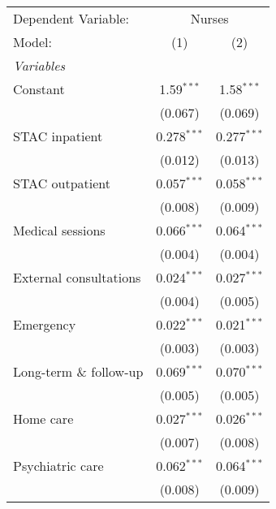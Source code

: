 
\begingroup
\centering
\begin{tabular}{lcc}
    \tabularnewline \midrule \midrule
    Dependent Variable:    & \multicolumn{2}{c}{Nurses}                      \\
    Model:                 & (1)                        & (2)                \\
    \midrule
    \emph{Variables}                                                         \\
    Constant               & 1.59$^{***}$               & 1.58$^{***}$       \\
                           & (0.067)                    & (0.069)            \\
    STAC inpatient         & 0.278$^{***}$              & 0.277$^{***}$      \\
                           & (0.012)                    & (0.013)            \\
    STAC outpatient        & 0.057$^{***}$              & 0.058$^{***}$      \\
                           & (0.008)                    & (0.009)            \\
    Medical sessions       & 0.066$^{***}$              & 0.064$^{***}$      \\
                           & (0.004)                    & (0.004)            \\
    External consultations & 0.024$^{***}$              & 0.027$^{***}$      \\
                           & (0.004)                    & (0.005)            \\
    Emergency              & 0.022$^{***}$              & 0.021$^{***}$      \\
                           & (0.003)                    & (0.003)            \\
    Long-term \& follow-up & 0.069$^{***}$              & 0.070$^{***}$      \\
                           & (0.005)                    & (0.005)            \\
    Home care              & 0.027$^{***}$              & 0.026$^{***}$      \\
                           & (0.007)                    & (0.008)            \\
    Psychiatric care       & 0.062$^{***}$              & 0.064$^{***}$      \\
                           & (0.008)                    & (0.009)            \\

\end{tabular}
